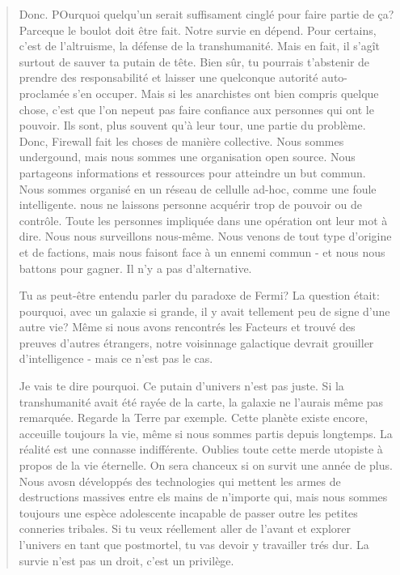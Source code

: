 \begin{quotation}
Donc. POurquoi quelqu'un serait suffisament cinglé pour faire partie de ça? Parceque le boulot doit être fait. Notre survie en dépend. Pour certains, c'est de l'altruisme, la défense de la transhumanité. Mais en fait, il s'agît surtout de sauver ta putain de tête. Bien sûr, tu pourrais t'abstenir de prendre des responsabilité et laisser une quelconque autorité auto-proclamée s'en occuper. Mais si les anarchistes ont bien compris quelque chose, c'est que l'on nepeut pas faire confiance aux personnes qui ont le pouvoir. Ils sont, plus souvent qu'à leur tour, une partie du problème. Donc, Firewall fait les choses de manière collective. Nous sommes undergound, mais nous sommes une organisation open source. Nous partageons informations et ressources pour atteindre un but commun. Nous sommes organisé en un réseau de cellulle ad-hoc, comme une foule intelligente. nous ne laissons personne acquérir trop de pouvoir ou de contrôle. Toute les personnes impliquée dans une opération ont leur mot à dire. Nous nous surveillons nous-même. Nous venons de tout type d'origine et de factions, mais nous faisont face à un ennemi commun - et nous nous battons pour gagner. Il n'y a pas d'alternative. 

Tu as peut-être entendu parler du paradoxe de Fermi? La question était: pourquoi, avec un galaxie si grande, il y avait tellement peu de signe d'une autre vie? Même si nous avons rencontrés les Facteurs et trouvé des preuves d'autres étrangers, notre voisinnage galactique devrait grouiller d'intelligence - mais ce n'est pas le cas. 

Je vais te dire pourquoi. Ce putain d'univers n'est pas juste. Si la transhumanité avait été rayée de la carte, la galaxie ne l'aurais même pas remarquée. Regarde la Terre par exemple. Cette planète existe encore, acceuille toujours la vie, même si nous sommes partis depuis longtemps. La réalité est une connasse indifférente. Oublies toute cette merde utopiste à propos de la vie éternelle. On sera chanceux si on survit une année de plus. Nous avosn développés des technologies qui mettent les armes de destructions massives entre els mains de n'importe qui, mais nous sommes toujours une espèce adolescente incapable de passer outre les petites conneries tribales. Si tu veux réellement aller de l'avant et explorer l'univers en tant que postmortel, tu vas devoir y travailler trés dur. La survie n'est pas un droit, c'est un privilège. 


\end{quotation}
